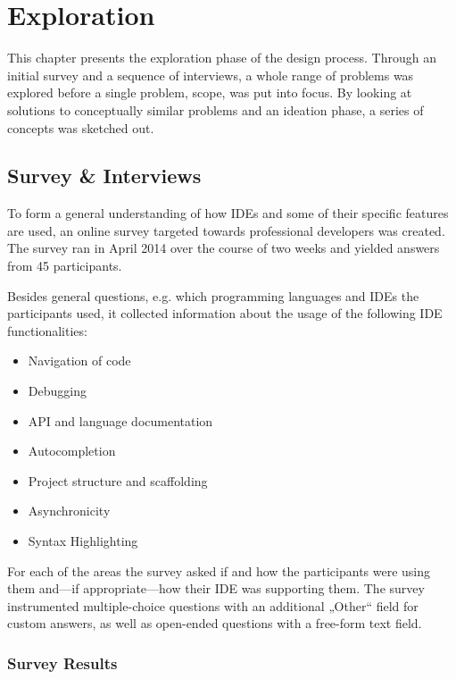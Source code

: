 \chapter{Exploration}\label{exploration}

This chapter presents the exploration phase of the design process.
Through an initial survey and a sequence of interviews, a whole range of
problems was explored before a single problem, scope, was put into
focus. By looking at solutions to conceptually similar problems and an
ideation phase, a series of concepts was sketched out.

\section{Survey \& Interviews}\label{survey-interviews}

To form a general understanding of how IDEs and some of their specific
features are used, an online survey targeted towards professional
developers was created. The survey ran in April 2014 over the course of
two weeks and yielded answers from 45 participants.

Besides general questions, e.g. which programming languages and IDEs the
participants used, it collected information about the usage of the
following IDE functionalities:

\begin{itemize}
\itemsep1pt\parskip0pt
\item
  Navigation of code
\item
  Debugging
\item
  API and language documentation
\item
  Autocompletion
\item
  Project structure and scaffolding
\item
  Asynchronicity
\item
  Syntax Highlighting
\end{itemize}

For each of the areas the survey asked if and how the participants were
using them and—if appropriate—how their IDE was supporting them. The
survey instrumented multiple-choice questions with an additional „Other“
field for custom answers, as well as open-ended questions with a
free-form text field.

\subsection{Survey Results}\label{survey-results}

